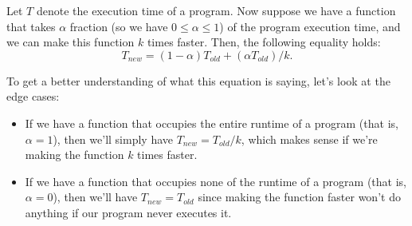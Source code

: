 Let $T$ denote the execution time of a program. Now suppose we have a function that takes $\alpha$ fraction (so we have $0 \leq \alpha \leq 1$) of the program execution time, and we can make this function $k$ times faster. Then, the following equality holds: \begin{equation*}
T_{new} = (1 - \alpha)T_{old} + (\alpha T_{old})/k.
\end{equation*}

To get a better understanding of what this equation is saying, let's look at the edge cases: \begin{itemize}
    \item If we have a function that occupies the entire runtime of a program (that is, $\alpha = 1$), then we'll simply have $T_{new} = T_{old}/k$, which makes sense if we're making the function $k$ times faster.
    \item If we have a function that occupies none of the runtime of a program (that is, $\alpha = 0$), then we'll have $T_{new} = T_{old}$ since making the function faster won't do anything if our program never executes it. 
\end{itemize}